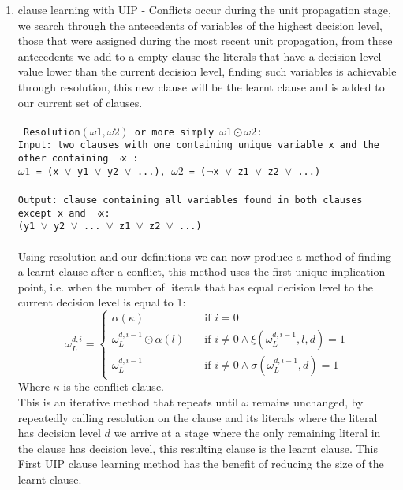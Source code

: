 \documentclass[12pt,a4paper]{article}
\begin{document}
\begin{enumerate}
\item{clause learning with UIP \cite{GRASP} - Conflicts occur during the unit propagation stage, we search through the antecedents of variables of the highest decision level, those that were assigned during the most recent unit propagation, from these antecedents we add to a empty clause the literals that have a decision level value lower than the current decision level, finding such variables is achievable through resolution, this new clause will be the learnt clause and is added to our current set of clauses.\\\\
\texttt{
Resolution$(\omega1, \omega2)$ or more simply $\omega1\odot\omega2$: \\
Input: two clauses with one containing unique variable x and the other containing $\neg$x :\\ \hspace*{1cm} $\omega1$ = (x $\lor$ y1  $\lor$ y2 $\lor$ ...), $\omega2$ = ($\neg$x $\lor$ z1 $\lor$ z2 $\lor$ ...)\\\\
Output: clause containing all variables found in both clauses except x and $\neg$x:\\ \hspace*{2.5cm} (y1  $\lor$ y2 $\lor$ ... $\lor$ z1 $\lor$ z2 $\lor$ ...)
}\\\\
Using resolution and our definitions we can now produce a method of finding a learnt clause after a conflict, this method uses the first unique implication point, i.e. when the number of literals that has equal decision level to the current decision level is equal to 1:\\
\[ \omega_L ^{d, i} = 
  \begin{cases}
    \alpha(\kappa) & \quad \text{if } i = 0\\
    \omega_L ^{d, i-1} \odot \alpha(l) & \quad \text{if } i \neq 0 \land \xi(\omega_L ^{d, i-1}, l, d) = 1\\
     \omega_L ^{d, i-1} & \quad \text{if } i \neq 0 \land \sigma(\omega_L ^{d, i-1}, d) = 1
  \end{cases}
\]
Where $\kappa$ is the conflict clause.\\
This is an iterative method that repeats until $\omega$ remains unchanged, by repeatedly calling resolution on the clause and its literals where the literal has decision level  $d$ we arrive at a stage where the only remaining literal in the clause has decision level, this resulting clause is the learnt clause. This First UIP clause learning method has the benefit of reducing the size of the learnt clause. 
}
\end{enumerate}
\end{document}
